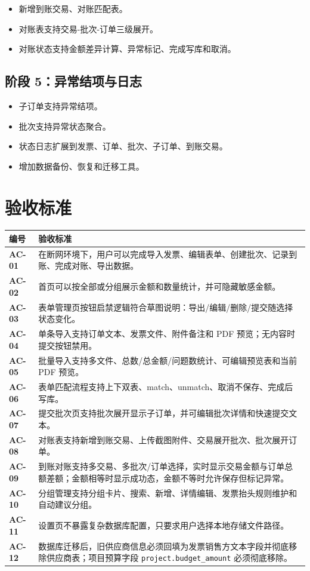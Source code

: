 \documentclass[UTF8,zihao=-4]{ctexart}
\newcommand{\req}[1]{\textbf{\textcolor{ivicBrown}{#1}}}
\begin{document}
\begin{itemize}
  \item 新增到账交易、对账匹配表。
  \item 对账表支持交易-批次-订单三级展开。
  \item 对账状态支持金额差异计算、异常标记、完成写库和取消。
\end{itemize}

\subsection{阶段 5：异常结项与日志}

\begin{itemize}
  \item 子订单支持异常结项。
  \item 批次支持异常状态聚合。
  \item 状态日志扩展到发票、订单、批次、子订单、到账交易。
  \item 增加数据备份、恢复和迁移工具。
\end{itemize}

\section{验收标准}

\begin{longtable}{p{3.0cm}p{11.4cm}}
\toprule
编号 & 验收标准 \\
\midrule
\req{AC-01} & 在断网环境下，用户可以完成导入发票、编辑表单、创建批次、记录到账、完成对账、导出数据。 \\
\req{AC-02} & 首页可以按全部或分组展示金额和数量统计，并可隐藏敏感金额。 \\
\req{AC-03} & 表单管理页按钮启禁逻辑符合草图说明：导出/编辑/删除/提交随选择状态变化。 \\
\req{AC-04} & 单条导入支持订单文本、发票文件、附件备注和 PDF 预览；无内容时提交按钮禁用。 \\
\req{AC-05} & 批量导入支持多文件、总数/总金额/问题数统计、可编辑预览表和当前 PDF 预览。 \\
\req{AC-06} & 表单匹配流程支持上下双表、match、unmatch、取消不保存、完成后写库。 \\
\req{AC-07} & 提交批次页支持批次展开显示子订单，并可编辑批次详情和快速提交文本。 \\
\req{AC-08} & 对账表支持新增到账交易、上传截图附件、交易展开批次、批次展开订单。 \\
\req{AC-09} & 到账对账支持多交易、多批次/订单选择，实时显示交易金额与订单总额差额；金额相等时显示成功态，金额不等时允许保存但标记异常。 \\
\req{AC-10} & 分组管理支持分组卡片、搜索、新增、详情编辑、发票抬头规则维护和自动建议分组。 \\
\req{AC-11} & 设置页不暴露复杂数据库配置，只要求用户选择本地存储文件路径。 \\
\req{AC-12} & 数据库迁移后，旧供应商信息必须回填为发票销售方文本字段并彻底移除供应商表；项目预算字段 \texttt{project.budget\_amount} 必须彻底移除。 \\
\bottomrule
\end{longtable}
\end{document}
